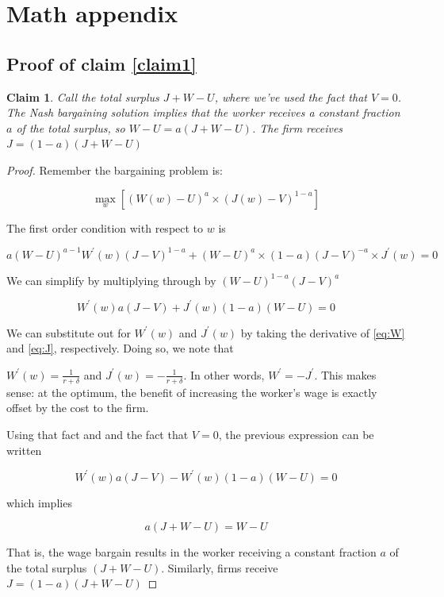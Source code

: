 \documentclass[12pt]{article}
\newtheorem*{Claim}{Claim}
\begin{document}
\newpage
\appendix
\section{Math appendix}
\subsection{Proof of claim \ref{claim1}}\label{claim1proof}



\begin{Claim}
Call the total surplus $J + W - U$, where we've used the fact that $ V= 0$.  The Nash bargaining solution implies that the worker receives  a constant fraction $a$ of the total surplus, so $W-U = a (J  + W - U)$.  The firm receives  $J = (1-a)(J + W -U)$
\end{Claim}


\begin{proof}
Remember the bargaining problem is:

$$ \max_w [(W(w) - U)^a \times (J(w) - V)^{1-a}] $$

The first order condition with respect to $w$ is

$$a(W - U)^{a-1} W^\prime(w)(J - V)^{1-a}+(W - U)^a \times (1-a)(J - V)^{-a} \times J^\prime(w) = 0 $$

We can simplify by multiplying through by $(W - U)^{1-a} (J - V)^a$

$$W^\prime(w) a(J - V) + J^\prime(w)(1-a)(W - U) = 0$$

We can substitute out for $W^\prime(w)$ and  $J^\prime(w)$  by taking the derivative of \eqref{eq:W} and \eqref{eq:J}, respectively. Doing so, we note that 

$W^\prime(w) = \frac{1}{r + \delta}$ and $J^\prime(w) = -\frac{1}{r+\delta}$.  In other words, $W^\prime = - J^{\prime}$.  This makes sense: at the optimum, the benefit of increasing the worker's wage is exactly offset by the cost to the firm.

Using that fact and and the fact that $V= 0$, the previous expression can be written

$$W^\prime(w) a (J - V) - W^\prime(w) (1-a) (W - U) = 0$$

which implies

$$a (J + W - U) = W - U $$

That is, the wage bargain results in the worker receiving a constant fraction $a$ of the total surplus $(J + W - U)$. Similarly, firms receive $J = (1-a)(J + W -U)$
\end{proof}
\end{document}
